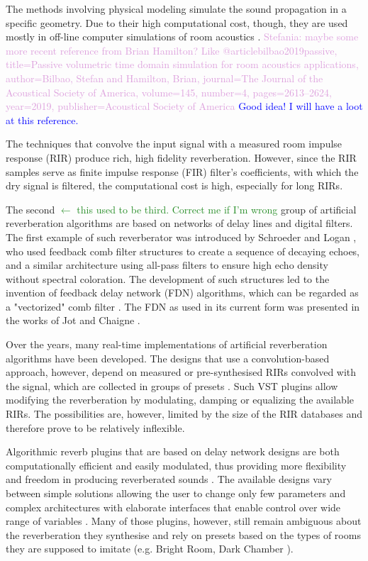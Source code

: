 \documentclass[twoside,a4paper]{article}
\newcommand{\silvin}[1]{\textcolor{ForestGreen}{#1}}
\newcommand{\karolina}[1]{\textcolor{blue}{#1}}
\newcommand{\stefania}[1]{\textcolor{Plum}{Stefania: #1}}
\begin{document}
The methods involving physical modeling simulate the sound propagation in a specific geometry. Due to their high computational cost, though, they are used mostly in off-line computer simulations of room acoustics \cite{peters2012}. \stefania{maybe some more recent reference from Brian Hamilton? Like @article{bilbao2019passive, title={Passive volumetric time domain simulation for room acoustics applications}, author={Bilbao, Stefan and Hamilton, Brian}, journal={The Journal of the Acoustical Society of America}, volume={145}, number={4}, pages={2613--2624}, year={2019}, publisher={Acoustical Society of America} }} \karolina{Good idea! I will have a loot at this reference.}

The techniques that convolve the input signal with a measured room impulse response (RIR) produce rich, high fidelity reverberation. However, since the RIR samples serve as finite impulse response (FIR) filter's coefficients, with which the dry signal is filtered, the computational cost is high, especially for long RIRs. 

The second \silvin{$\leftarrow$ this used to be third. Correct me if I'm wrong} group of artificial reverberation algorithms are based on networks of delay lines and digital filters. The first example of such reverberator was introduced by Schroeder and Logan \cite{schroeder}, who used feedback comb filter structures to create a sequence of decaying echoes, and a similar architecture using all-pass filters to ensure high echo density without spectral coloration. The development of such structures led to the invention of feedback delay network (FDN) algorithms, which can be regarded as a "vectorized" comb filter \cite{Valimaki:2012}. The FDN as used in its current form was presented in the works of Jot and Chaigne \cite{Jot:Chaine:1991:aes, Jot:Chaine:1996}. 

Over the years, many real-time implementations of artificial reverberation algorithms have been developed. The designs that use a convolution-based approach, however, depend on measured or pre-synthesised RIRs convolved with the signal, which are collected in groups of presets \cite{peters2012, heise2009automatic, borss2009, ableton}. Such VST plugins allow modifying the reverberation by modulating, damping or equalizing the available RIRs. The possibilities are, however, limited by the size of the RIR databases and therefore prove to be relatively inflexible. 

Algorithmic reverb plugins that are based on delay network designs are both computationally efficient and easily modulated, thus providing more flexibility and freedom in producing reverberated sounds \cite{kereliuk2018, philbert2017developing}. The available designs vary between simple solutions allowing the user to change only few parameters \cite{moffat2019} and complex architectures with elaborate interfaces that enable control over wide range of variables \cite{erbe2015}. Many of those plugins, however, still remain ambiguous about the reverberation they synthesise and rely on presets based on the types of rooms they are supposed to imitate (e.g. Bright Room, Dark Chamber \cite{valhalla}).
\end{document}
